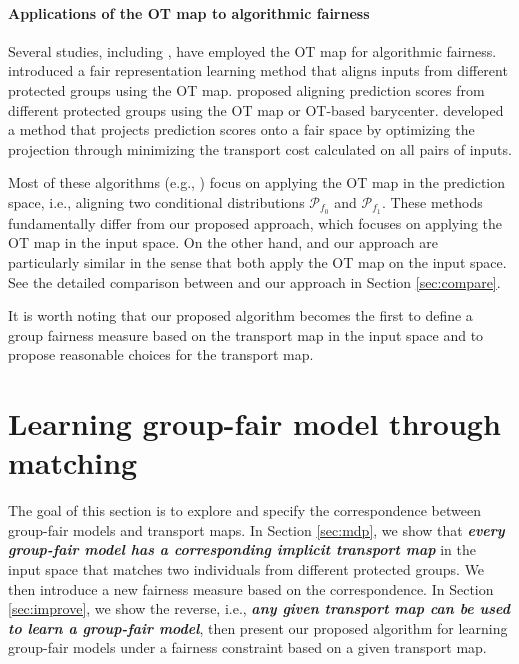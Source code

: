\documentclass[10pt]{article} %
\begin{document}


\paragraph{Applications of the OT map to algorithmic fairness}

Several studies, including \citet{pmlr-v97-gordaliza19a, pmlr-v115-jiang20a, NEURIPS2020_51cdbd26, Silvia_Ray_Tom_Aldo_Heinrich_John_2020, buyl2022optimal}, have employed the OT map for algorithmic fairness.
\citet{pmlr-v97-gordaliza19a} introduced a fair representation learning method that aligns inputs from different protected groups using the OT map.
\citet{pmlr-v115-jiang20a, NEURIPS2020_51cdbd26, Silvia_Ray_Tom_Aldo_Heinrich_John_2020} proposed aligning prediction scores from different protected groups using the OT map or OT-based barycenter.
\citet{buyl2022optimal} developed a method that projects prediction scores onto a fair space by optimizing the projection through minimizing the transport cost calculated on all pairs of inputs.

Most of these algorithms (e.g., \citet{pmlr-v115-jiang20a, NEURIPS2020_51cdbd26, Silvia_Ray_Tom_Aldo_Heinrich_John_2020}) focus on applying the OT map in the prediction space, i.e., aligning two conditional distributions $\mathcal{P}_{f_{0}}$ and $\mathcal{P}_{f_{1}}.$
These methods fundamentally differ from our proposed approach, which focuses on applying the OT map in the input space.
On the other hand, \citet{pmlr-v97-gordaliza19a} and our approach are particularly similar in the sense that both apply the OT map on the input space.
See the detailed comparison between \citet{pmlr-v97-gordaliza19a} and our approach in Section \ref{sec:compare}.  

It is worth noting that our proposed algorithm becomes the first to define a group fairness measure based on the transport map in the input space and to propose reasonable choices for the transport map.


\section{Learning group-fair model through matching}\label{sec:measure}

The goal of this section is to explore and specify the correspondence between group-fair models and transport maps.
In Section \ref{sec:mdp}, we show that \textbf{\textit{every group-fair model has a corresponding implicit transport map}} in the input space that matches two individuals from different protected groups.
We then introduce a new fairness measure based on the correspondence.
In Section \ref{sec:improve}, we show the reverse, i.e., \textbf{\textit{any given transport map can be used to learn a group-fair model}}, then present our proposed algorithm for learning group-fair models under a fairness constraint based on a given transport map.
\end{document}
